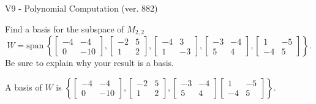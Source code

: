 \begin{exercise}
  \begin{exerciseTitle}V9 - Polynomial Computation (ver. 882)\end{exerciseTitle}
  \begin{exerciseStatement}
    Find a basis for the subspace of \(M_{2,2}\) 
\[W=\mathrm{span}\ \left\{\left[\begin{array}{cc}
-4 & -4 \\
0 & -10
\end{array}\right] , \left[\begin{array}{cc}
-2 & 5 \\
1 & 2
\end{array}\right] , \left[\begin{array}{cc}
-4 & 3 \\
1 & -3
\end{array}\right] , \left[\begin{array}{cc}
-3 & -4 \\
5 & 4
\end{array}\right] , \left[\begin{array}{cc}
1 & -5 \\
-4 & 5
\end{array}\right]\right\}.\]
 Be sure to explain why your result is a basis.


  \end{exerciseStatement}
  \begin{exerciseAnswer}
   A basis of \(W\) is  \(\left\{\left[\begin{array}{cc}
-4 & -4 \\
0 & -10
\end{array}\right] , \left[\begin{array}{cc}
-2 & 5 \\
1 & 2
\end{array}\right] , \left[\begin{array}{cc}
-3 & -4 \\
5 & 4
\end{array}\right] \left[\begin{array}{cc}
1 & -5 \\
-4 & 5
\end{array}\right]\right\}\).
  


  \end{exerciseAnswer}
\end{exercise}